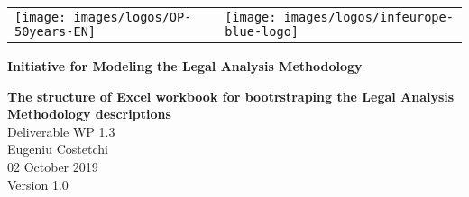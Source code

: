 
\newcommand{\DelTitle}{The structure of Excel workbook for bootrstraping the Legal Analysis Methodology descriptions}
\newcommand{\DelNumber}{WP 1.3}
\newcommand{\DelVersion}{1.0}
\newcommand{\DelAuthor}{Eugeniu Costetchi}
\newcommand{\DelDate}{02 October 2019}
\newcommand{\DelFilename}{wp1-3-excel-structure}


\pagestyle{empty}
\graphicspath{{figures/}}

\begin{titlepage}
\begin{center}

\begin{center}
  \begin{center}
    \setlength{\tabcolsep}{0pt}
    \begin{tabular}{>{\raggedleft}m{3.5cm}>{\centering}m{\dimexpr\textwidth - 8cm\relax}>{\raggedright}m{3.5cm}}
      \texttt{[image: images/logos/OP-50years-EN]}%
      &%
      &%
      \texttt{[image: images/logos/infeurope-blue-logo]} %
    \end{tabular}
  \end{center}


  \vspace{2mm}

  \end{center}
  \vspace{4cm}
  \textbf{{\large Initiative for Modeling the Legal Analysis Methodology\\}}
  \vspace{2cm}
  
  \begin{spacing}{2.5}
    \textbf{\Huge \DelTitle}\\ \vspace{2cm}
    {\large Deliverable \DelNumber} \\ %
  {\large \DelAuthor} \\ %
  {\large \DelDate} \\ %
    {\large Version \DelVersion}
  \end{spacing}
  
  \vspace*{\fill}


\end{center}
\end{titlepage}

